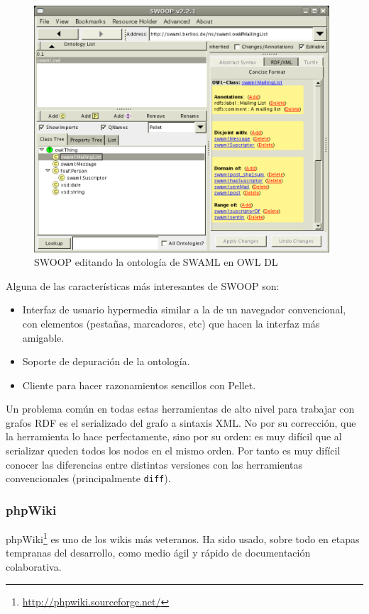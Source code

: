 \begin{figure}[ht]
	\centering
	\includegraphics[width=11cm]{images/screenshots/swoop.png}
	\caption{SWOOP editando la ontología de SWAML en OWL DL}
	\label{fig:evoWeb}
\end{figure}

Alguna de las características más interesantes de SWOOP son:

\begin{itemize}
  \item Interfaz de usuario hypermedia similar a la de un navegador convencional, 
	con elementos (pestañas, marcadores, etc) que hacen la interfaz más 
	amigable.
  \item Soporte de depuración de la ontología.
  \item Cliente para hacer razonamientos sencillos con Pellet.
\end{itemize}

Un problema común en todas estas herramientas de alto nivel para trabajar con
grafos RDF es el serializado del grafo a sintaxis XML. No por su corrección,
que la herramienta lo hace perfectamente, sino por su orden: es muy difícil
que al serializar queden todos los nodos en el mismo orden. Por tanto es muy
difícil conocer las diferencias entre distintas versiones con las herramientas
convencionales (principalmente \texttt{diff}).

\subsubsection{phpWiki}

phpWiki\footnote{\url{http://phpwiki.sourceforge.net/}} es uno de los wikis
más veteranos. Ha sido usado, sobre todo en etapas tempranas del desarrollo, 
como medio ágil y rápido de documentación colaborativa.

